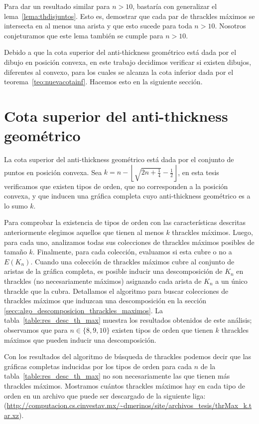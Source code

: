     Para dar un resultado similar para $n > 10$, bastaría con generalizar el
    lema~\ref{lema:thdisjuntos}. Esto es, demostrar que cada par de thrackles máximos se
    intersecta en al menos una arista y que esto sucede para toda $n > 10$. Nosotros
    conjeturamos que este lema también se cumple para $n>10$.

    Debido a que la cota superior del anti-thickness geométrico está dada por
    el dibujo en posición convexa, en este trabajo decidimos verificar si existen
    dibujos, diferentes al convexo, para los cuales se alcanza la cota inferior
    dada por el teorema~\ref{teo:nuevacotainf}. Hacemos esto en la siguiente sección.

\section{Cota superior del anti-thickness geométrico}\label{secc:descomposicion_thrackles_maximos}

  La cota superior del anti-thickness geométrico está dada por el conjunto
  de puntos en posición convexa. Sea $k=n - \left\lfloor\sqrt{2n+\frac{1}{4}} -
  \frac{1}{2}\right\rfloor$, en esta tesis verificamos que existen tipos de
  orden, que no corresponden a la posición convexa, y que inducen una gráfica
  completa cuyo anti-thickness geométrico es a lo sumo $k$.

  Para comprobar la existencia de tipos de orden con las características descritas
  anteriormente elegimos aquellos que tienen al menos $k$ thrackles
  máximos. Luego, para cada uno, analizamos todas sus colecciones de thrackles
  máximos posibles de tamaño $k$. Finalmente, para cada colección, evaluamos si
  esta cubre o no a $E(K_n)$. Cuando una colección de thrackles máximos cubre
  al conjunto de aristas de la gráfica completa, es posible inducir una descomposición
  de $K_n$ en thrackles (no necesariamente máximos) asignando cada arista de $K_n$
  a un único thrackle que la cubra. Detallamos el algoritmo para buscar
  colecciones de thrackles máximos que induzcan una descomposición en la sección
  \ref{secc:algo_descomposicion_thrackles_maximos}. La tabla~\ref{table:res_desc_th_max}
  muestra los resultados obtenidos de este análisis; observamos que para
  $n\in \{8,9,10\}$ existen tipos de orden que tienen $k$ thrackles máximos que
  pueden inducir una descomposición.

  Con los resultados del algoritmo de búsqueda de thrackles podemos decir que las gráficas completas
  inducidas por los tipos de orden para cada $n$ de la tabla~\ref{table:res_desc_th_max} no son
  necesariamente las que tienen más thrackles máximos. Mostramos cuántos thrackles máximos hay en cada
  tipo de orden en un archivo que puede ser descargado de la siguiente liga:
  (\url{http://computacion.cs.cinvestav.mx/~dmerinos/site/archivos_tesis/thrMax_k.tar.xz}).

